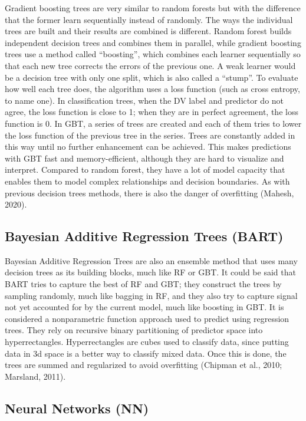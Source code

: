 \documentclass[
  man]{apa7}
\begin{document}
Gradient boosting trees are very similar to random forests but with the difference that the former learn sequentially instead of randomly.
The ways the individual trees are built and their results are combined is different.
Random forest builds independent decision trees and combines them in parallel, while gradient boosting trees use a method called ``boosting'', which combines each learner sequentially so that each new tree corrects the errors of the previous one.
A weak learner would be a decision tree with only one split, which is also called a ``stump''.
To evaluate how well each tree does, the algorithm uses a loss function (such as cross entropy, to name one).
In classification trees, when the DV label and predictor do not agree, the loss function is close to 1; when they are in perfect agreement, the loss function is 0.
In GBT, a series of trees are created and each of them tries to lower the loss function of the previous tree in the series.
Trees are constantly added in this way until no further enhancement can be achieved.
This makes predictions with GBT fast and memory-efficient, although they are hard to visualize and interpret.
Compared to random forest, they have a lot of model capacity that enables them to model complex relationships and decision boundaries.
As with previous decision trees methods, there is also the danger of overfitting (Mahesh, 2020).

\subsection{Bayesian Additive Regression Trees (BART)}\label{bayesian-additive-regression-trees-bart}

Bayesian Additive Regression Trees are also an ensemble method that uses many decision trees as its building blocks, much like RF or GBT.
It could be said that BART tries to capture the best of RF and GBT; they construct the trees by sampling randomly, much like bagging in RF, and they also try to capture signal not yet accounted for by the current model, much like boosting in GBT.
It is considered a nonparametric function approach used to predict using regression trees.
They rely on recursive binary partitioning of predictor space into hyperrectangles.
Hyperrectangles are cubes used to classify data, since putting data in 3d space is a better way to classify mixed data.
Once this is done, the trees are summed and regularized to avoid overfitting (Chipman et al., 2010; Marsland, 2011).

\subsection{Neural Networks (NN)}\label{neural-networks-nn}
\end{document}

